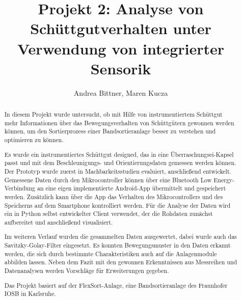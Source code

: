 \documentclass[cover]{isas-seminar}
\title{Projekt 2: Analyse von Schüttgutverhalten unter Verwendung von integrierter Sensorik}
\author{Andrea Bittner, Maren Kucza}
\begin{document}
\maketitle

\begin{abstract}
In diesem Projekt wurde untersucht, ob mit Hilfe von instrumentiertem Schüttgut mehr Informationen über das Bewegungsverhalten von Schüttgütern gewonnen werden können, um den Sortierprozess einer Bandsortieranlage besser zu verstehen und optimieren zu können. 

Es wurde ein instrumentiertes Schüttgut designed, das in eine Überraschungsei-Kapsel passt und mit dem Beschleunigungs- und Orientierungsdaten gemessen werden können. Der Prototyp wurde zuerst in Machbarkeitsstudien evaluiert, anschließend entwickelt. Gemessene Daten durch den Mikrocontroller können über eine Bluetooth Low Energy-Verbindung an eine eigen implementierte Android-App übermittelt und gespeichert werden. Zusätzlich kann über die App das Verhalten des Mikrocontrollers und des Speicherns auf dem Smartphone kontrolliert werden. Für die Analyse der Daten wird ein in Python selbst entwickelter Client verwendet, der die Rohdaten zunächst aufbereitet und anschließend visualisiert. 

Im weiteren Verlauf wurden die gesammelten Daten ausgewertet, dabei wurde auch das Savitzky-Golay-Filter eingesetzt. Es konnten Bewegungsmuster in den Daten erkannt werden, die sich durch bestimmte Charakteristiken auch auf die Anlagenmodule abbilden lassen. Neben dem Fazit mit den gewonnen Erkenntnissen aus Messreihen und Datenanalysen werden Vorschläge für Erweiterungen gegeben.

Das Projekt basiert auf der FlexSort-Anlage, eine Bandsortieranlage des Fraunhofer IOSB in Karlsruhe.
\end{abstract}

\clearpage
\tableofcontents
\cleardoublepage




\end{document}

